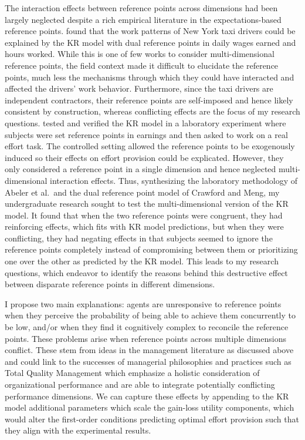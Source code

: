 \documentclass[12pt, letterpaper]{article}
\begin{document}
The interaction effects between reference points across dimensions had been largely neglected despite a rich empirical literature in the expectations-based reference points. \textcite{crawford.2011.newyork} found that the work patterns of New York taxi drivers could be explained by the KR model with dual reference points in daily wages earned and hours worked. While this is one of few works to consider multi-dimensional reference points, the field context made it difficult to elucidate the reference points, much less the mechanisms through which they could have interacted and affected the drivers' work behavior. Furthermore, since the taxi drivers are independent contractors, their reference points are self-imposed and hence likely consistent by construction, whereas conflicting effects are the focus of my research questions. \textcite{abeler.2011.referencepoints} tested and verified the KR model in a laboratory experiment where subjects were set reference points in earnings and then asked to work on a real effort task. The controlled setting allowed the reference points to be exogenously induced so their effects on effort provision could be explicated. However, they only considered a reference point in a single dimension and hence neglected multi-dimensional interaction effects. Thus, synthesizing the laboratory methodology of Abeler et al.~and the dual reference point model of Crawford and Meng, my undergraduate research sought to test the multi-dimensional version of the KR model. It found that when the two reference points were congruent, they had reinforcing effects, which fits with KR model predictions, but when they were conflicting, they had negating effects in that subjects seemed to ignore the reference points completely instead of compromising between them or prioritizing one over the other as predicted by the KR model. This leads to my research questions, which endeavor to identify the reasons behind this destructive effect between disparate reference points in different dimensions.

I propose two main explanations: agents are unresponsive to reference points when they perceive the probability of being able to achieve them concurrently to be low, and/or when they find it cognitively complex to reconcile the reference points. These problems arise when reference points across multiple dimensions conflict. These stem from ideas in the management literature as discussed above and could link to the successes of managerial philosophies and practices such as Total Quality Management which emphasize a holistic consideration of organizational performance and are able to integrate potentially conflicting performance dimensions. We can capture these effects by appending to the KR model additional parameters which scale the gain-loss utility components, which would alter the first-order conditions predicting optimal effort provision such that they align with the experimental results.
\end{document}
